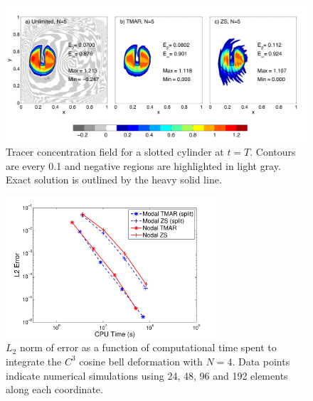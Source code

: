 \documentclass{ametsoc}
\begin{document}
\begin{figure}[t]
\includegraphics[width=\textwidth]{figs/2d/defCyl_3panel.pdf}
\caption{Tracer concentration field for a slotted cylinder at $t=T$. Contours are every 0.1 and negative regions are highlighted in light gray. Exact solution is outlined by the heavy solid line.}\label{fig:2dCyl}
\end{figure}

\begin{figure}[t]
\includegraphics[width=0.7\textwidth]{figs/2d/cosbellDef_L2Cpu.pdf}
\caption{$L_2$ norm of error as a function of computational time spent to integrate the $C^3$ cosine bell deformation with $N=4$. Data points indicate numerical simulations using 24, 48, 96 and 192 elements along each coordinate. }
\label{fig:L2cpu}
\end{figure}
\end{document}
